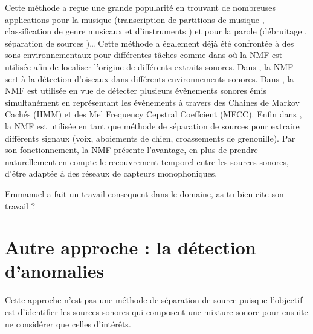 Cette méthode a reçue une grande popularité en trouvant de nombreuses applications pour la musique (transcription de partitions de musique \cite{smaragdis_non-negative_2003,bertin2009tempering}, classification de genre musicaux \cite{panagakis2008music} et d'instruments \cite{benetos2006musical}) et pour la parole (débruitage \cite{wilson2008speech,sprechmann2014supervised}, séparation de sources \cite{smaragdis2007convolutive,
hurmalainen2012detection})\dots{}
Cette méthode a également déjà été confrontée à des sons environnementaux pour différentes tâches comme dans \cite{kumar2016audio} où la NMF est utilisée afin de localiser l'origine de différents extraits sonores. Dans \cite{sobieraj2017masked}, la NMF sert à la détection d'oiseaux dans différents environnements sonores. Dans \cite{heittola_sound_2011}, la NMF est utilisée en vue de détecter plusieurs évènements sonores émis simultanément en représentant les évènements à travers des Chaines de Markov Cachés (HMM) et des Mel Frequency Cepstral Coeffcient (MFCC).  Enfin dans \cite{satoshi_innami_nmf-based_2012}, la NMF est utilisée en tant que méthode de séparation de sources pour extraire différents signaux (voix, aboiements de chien, croassements de grenouille).
Par son fonctionnement, la NMF présente l'avantage, en plus de prendre naturellement en compte le recouvrement temporel entre les sources sonores, d'être adaptée à des réseaux de capteurs monophoniques.

Emmanuel a fait un travail consequent dans le domaine, as-tu bien cite son travail ?

\section{Autre approche : la détection d'anomalies}

Cette approche n'est pas une méthode de séparation de source puisque l'objectif est d'identifier les sources sonores qui composent une mixture sonore pour ensuite ne considérer que celles d'intérêts.

